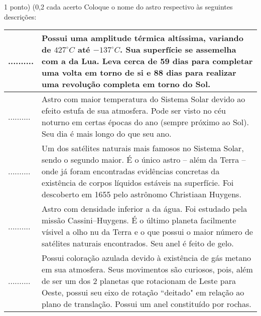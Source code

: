 \documentclass{../lista}
\begin{document}

	\begin{questao}{1 ponto) (0,2 cada acerto}
		Coloque o nome do astro respectivo às seguintes descrições:
		\begin{center} \begin{tabular}{|M{0.2\textwidth}|M{0.65\textwidth}|}
			\hline
			.......... & Possui uma amplitude térmica altíssima, variando de $427^{\circ}C$ até $-137^{\circ}C$. Sua superfície se assemelha com a da Lua. Leva cerca de 59 dias para completar uma volta em torno de si e 88 dias para realizar uma revolução completa em torno do Sol. \\ \hline
			.......... & Astro com maior temperatura do Sistema Solar devido ao efeito estufa de sua atmosfera. Pode ser visto no céu noturno em certas épocas do ano (sempre próximo ao Sol). Seu dia é mais longo do que seu ano. \\ \hline
			.......... & Um dos satélites naturais mais famosos no Sistema Solar, sendo o segundo maior. É o único astro -- além da Terra -- onde já foram encontradas evidências concretas da existência de corpos líquidos estáveis na superfície. Foi descoberto em 1655 pelo astrônomo Christiaan Huygens. \\ \hline
			.......... & Astro com densidade inferior a da água. Foi estudado pela missão Cassini–Huygens. É o último planeta facilmente vísivel a olho nu da Terra e o que possui o maior número de satélites naturais encontrados. Seu anel é feito de gelo. \\ \hline
			.......... & Possui coloração azulada devido à existência de gás metano em sua atmosfera. Seus movimentos são curiosos, pois, além de ser um dos 2 planetas que rotacionam de Leste para Oeste, possui seu eixo de rotação ``deitado" em relação ao plano de translação. Possui um anel constituído por rochas.\\ \hline
		\end{tabular} \end{center}
	\end{questao}
\end{document}
